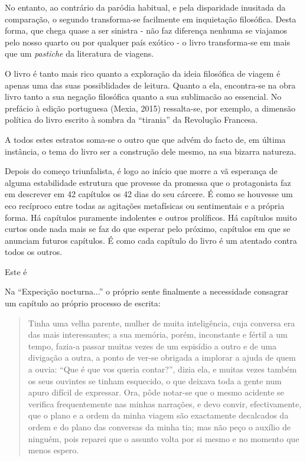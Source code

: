 \documentclass[12pt,a4paper]{article}
\begin{document}
No entanto, ao contrário da paródia habitual, e pela disparidade inusitada da comparação, o segundo transforma-se facilmente em inquietação filosófica. Desta forma, que chega quase a ser sinistra - não faz diferença nenhuma se viajamos pelo nosso quarto ou por qualquer país exótico - o livro transforma-se em mais que um \emph{pastiche} da literatura de viagens.

O livro é tanto mais rico quanto a exploração da ideia filosófica de viagem é apenas uma das suas possiblidades de leitura. Quanto a ela, encontra-se na obra livro tanto a sua negação filosófica quanto a sua sublimacão ao essencial. No prefácio à edição portuguesa (Mexia, 2015) ressalta-se, por exemplo, a dimensão política do livro escrito à sombra da ``tirania'' da Revolução Francesa.

A todos estes estratos soma-se o outro que que advém do facto de, em última instância, o tema do livro ser a construção dele mesmo, na sua bizarra natureza.

Depois do começo triunfalista, é logo ao início que morre a vã esperança de alguma estabilidade estrutura que provesse da promessa que o protagonista faz em descrever em 42 capítulos os 42 dias do seu cárcere. É como se houvesse um eco recíproco entre todas as agitações metafísicas ou sentimentais e a própria forma. Há capítulos puramente indolentes e outros prolíficos. Há capítulos muito curtos onde nada mais se faz do que esperar pelo próximo, capítulos em que se anunciam futuros capítulos. É como cada capítulo do livro é um atentado contra todos os outros.

Este é 

Na ``Expecição nocturna...'' o próprio sente finalmente a necessidade consagrar um capítulo ao próprio processo de escrita:

\begin{quote}
  Tinha uma velha parente, mulher de muita inteligência, cuja conversa era das mais interessantes; a sua memória, porém, inconstante e fértil a um tempo, fazia-a passar muitas vezes de um espisídio a outro e de uma divigação a outra, a ponto de ver-se obrigada a implorar a ajuda de quem a ouvia: ``Que é que vos queria contar?'', dizia ela, e muitas vezes também os seus ouvintes se tinham esquecido, o que deixava toda a gente num apuro difícil de expressar. Ora, pôde notar-se que o mesmo acidente se verifica frequentemente nas minhas narrações, e devo convir, efectivamente, que o plano e a ordem da minha viagem são exactamente decalcados da ordem e do plano das conversas da minha tia; mas não peço o auxílio de ninguém, pois reparei que o assunto volta por si mesmo e no momento que menos espero.
\end{quote}
\end{document}
